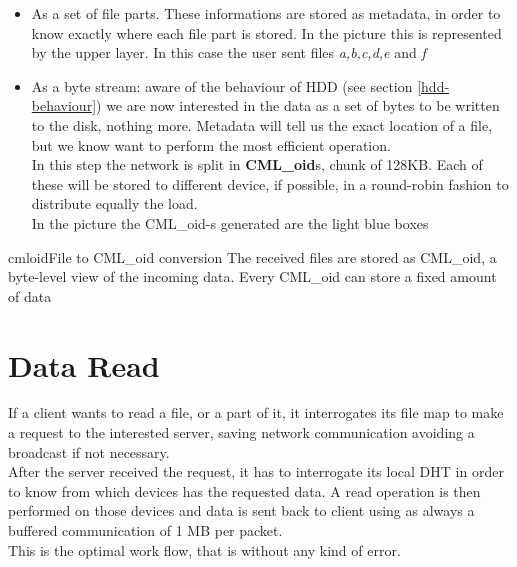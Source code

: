 \begin{itemize}
    \item As a set of file parts. These informations are stored as metadata, in
        order to know exactly where each file part is stored. In the picture
        this is represented by the upper layer. In this case the user sent files
        \textit{a,b,c,d,e} and \textit{f}
    \item As a byte stream: aware of the behaviour of HDD (see section
        \ref{hdd-behaviour}) we are now interested in the data as a set of bytes
        to be written to the disk, nothing more. Metadata will tell us the exact
        location of a file, but we know want to perform the most efficient
        operation. \\
        In this step the network is split in \textbf{CML\_oid}s, chunk of 128KB.
        Each of these will be stored to different device, if possible, in a
        round-robin fashion to distribute equally the load. \\
        In the picture the CML\_oid-s generated are the light blue boxes
\end{itemize}

\begin{myimage}{cmloid}{File to CML\_oid conversion}
    The received files are stored as CML\_oid, a byte-level view of the incoming
    data. Every CML\_oid can store a fixed amount of data
\end{myimage}

\section{Data Read}
If a client wants to read a file, or a part of it, it interrogates its file map
to make a request to the interested server, saving network communication
avoiding a broadcast if not necessary. \\
After the server received the request, it has to interrogate its local DHT in
order to know from which devices has the requested data. A read operation is
then performed on those devices and data is sent back to client using as always
a buffered communication of 1 MB per packet. \\
This is the optimal work flow, that is without any kind of error.



